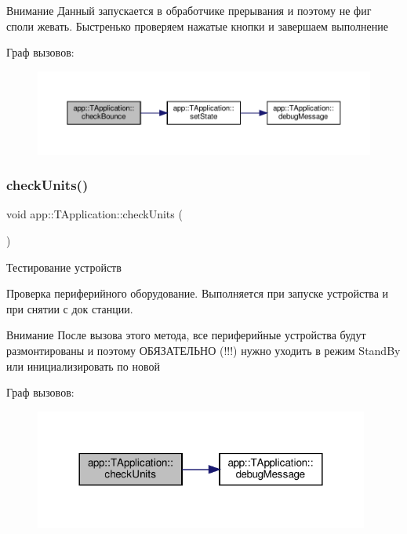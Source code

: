\begin{DoxyAttention}{Внимание}
Данный запускается в обработчике прерывания и поэтому не фиг споли жевать. Быстренько проверяем нажатые кнопки и завершаем выполнение 
\end{DoxyAttention}
Граф вызовов\+:\nopagebreak
\begin{figure}[H]
\begin{center}
\leavevmode
\includegraphics[width=350pt]{classapp_1_1_t_application_a4c4d1d33ea8ab73ba49a59528d200501_cgraph}
\end{center}
\end{figure}
\mbox{\label{classapp_1_1_t_application_acf71a4fe338cbc1e771cc9a60431c3bf}} 
\subsubsection{\texorpdfstring{check\+Units()}{checkUnits()}}
{\footnotesize\ttfamily void app\+::\+T\+Application\+::check\+Units (\begin{DoxyParamCaption}{ }\end{DoxyParamCaption})}



Тестирование устройств 

Проверка периферийного оборудование. Выполняется при запуске устройства и при снятии с док станции. \begin{DoxyAttention}{Внимание}
После вызова этого метода, все периферийные устройства будут размонтированы и поэтому ОБЯЗАТЕЛЬНО (!!!) нужно уходить в режим Stand\+By или инициализировать по новой 
\end{DoxyAttention}
Граф вызовов\+:\nopagebreak
\begin{figure}[H]
\begin{center}
\leavevmode
\includegraphics[width=312pt]{classapp_1_1_t_application_acf71a4fe338cbc1e771cc9a60431c3bf_cgraph}
\end{center}
\end{figure}
\mbox{\label{classapp_1_1_t_application_aaa44a223c18f6087f10eb9bae637b90c}} 
